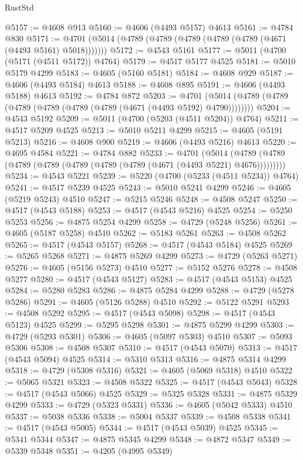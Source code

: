 \begin{lexlean}{RustStd}
\begin{coremodule}
@5157 := @4608 @913
@5160 := @4606 (@4493 @5157) @4613
@5161 := @4784 @830
@5171 := @4701 (@5014 (@4789 (@4789 (@4789 (@4789 (@4789 (@4671 (@4493 @5161) @5018)))))))
@5172 := @4543 @5161
@5177 := @5011 (@4700 (@5171 (@4511 @5172)) @4764)
@5179 := @4517 @5177 @4525
@5181 := @5010 @5179 @4299
@5183 := @4605 (@5160 @5181)
@5184 := @4608 @929
@5187 := @4606 (@4493 @5184) @4613
@5188 := @4608 @895
@5191 := @4606 (@4493 @5188) @4613
@5192 := @4784 @872
@5203 := @4701 (@5014 (@4789 (@4789 (@4789 (@4789 (@4789 (@4789 (@4671 (@4493 @5192) @4790))))))))
@5204 := @4543 @5192
@5209 := @5011 (@4700 (@5203 (@4511 @5204)) @4764)
@5211 := @4517 @5209 @4525
@5213 := @5010 @5211 @4299
@5215 := @4605 (@5191 @5213)
@5216 := @4608 @900
@5219 := @4606 (@4493 @5216) @4613
@5220 := @4695 @4584
@5221 := @4784 @882
@5233 := @4701
    (@5014 (@4789 (@4789 (@4789 (@4789 (@4789 (@4789 (@4789 (@4671 (@4493 @5221) @4676)))))))))
@5234 := @4543 @5221
@5239 := @5220 (@4700 (@5233 (@4511 @5234)) @4764)
@5241 := @4517 @5239 @4525
@5243 := @5010 @5241 @4299
@5246 := @4605 (@5219 @5243) @4510
@5247 := @5215 @5246
@5248 := @4508 @5247
@5250 := @4517 (@4543 @5188)
@5253 := @4517 (@4543 @5216) @4525
@5254 := @5250 @5253
@5256 := @4875 @5254 @4299
@5258 := @4729 (@5248 @5256)
@5261 := @4605 (@5187 @5258) @4510
@5262 := @5183 @5261
@5263 := @4508 @5262
@5265 := @4517 (@4543 @5157)
@5268 := @4517 (@4543 @5184) @4525
@5269 := @5265 @5268
@5271 := @4875 @5269 @4299
@5273 := @4729 (@5263 @5271)
@5276 := @4605 (@5156 @5273) @4510
@5277 := @5152 @5276
@5278 := @4508 @5277
@5280 := @4517 (@4543 @5127)
@5283 := @4517 (@4543 @5153) @4525
@5284 := @5280 @5283
@5286 := @4875 @5284 @4299
@5288 := @4729 (@5278 @5286)
@5291 := @4605 (@5126 @5288) @4510
@5292 := @5122 @5291
@5293 := @4508 @5292
@5295 := @4517 (@4543 @5098)
@5298 := @4517 (@4543 @5123) @4525
@5299 := @5295 @5298
@5301 := @4875 @5299 @4299
@5303 := @4729 (@5293 @5301)
@5306 := @4605 (@5097 @5303) @4510
@5307 := @5093 @5306
@5308 := @4508 @5307
@5310 := @4517 (@4543 @5070)
@5313 := @4517 (@4543 @5094) @4525
@5314 := @5310 @5313
@5316 := @4875 @5314 @4299
@5318 := @4729 (@5308 @5316)
@5321 := @4605 (@5069 @5318) @4510
@5322 := @5065 @5321
@5323 := @4508 @5322
@5325 := @4517 (@4543 @5043)
@5328 := @4517 (@4543 @5066) @4525
@5329 := @5325 @5328
@5331 := @4875 @5329 @4299
@5333 := @4729 (@5323 @5331)
@5336 := @4605 (@5042 @5333) @4510
@5337 := @5038 @5336
@5338 := @5004 @5337
@5339 := @4508 @5338
@5341 := @4517 (@4543 @5005)
@5344 := @4517 (@4543 @5039) @4525
@5345 := @5341 @5344
@5347 := @4875 @5345 @4299
@5348 := @4872 @5347
@5349 := @5339 @5348
@5351 := @4205 (@4995 @5349)

\end{coremodule}
\end{lexlean}
